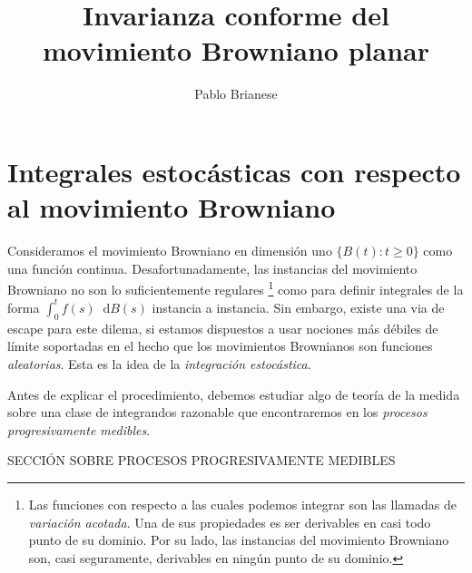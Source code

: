 \documentclass{article}
\title{Invarianza conforme del movimiento Browniano planar}
\author{Pablo Brianese}
\newcommand{\brownian}{B}
\newcommand{\dd}{\mathop{}\!\mathrm{d}}
\theoremstyle{plain}
\theoremstyle{remark}
\theoremstyle{definition}
\begin{document}
\maketitle


\part{Integrales estocásticas con respecto al movimiento Browniano}

Consideramos el movimiento Browniano en dimensión uno \(\{\brownian(t) : t \geq 0\}\) como una función continua.
Desafortunadamente, las instancias del movimiento Browniano no son lo suficientemente regulares
\footnote{Las funciones con respecto a las cuales podemos integrar son las llamadas de \emph{variación acotada}.
Una de sus propiedades es ser derivables en casi todo punto de su dominio.
Por su lado, las instancias del movimiento Browniano son, casi seguramente, derivables en ningún punto de su dominio.}
como para definir integrales de la forma \(\int_0^t f(s) \dd \brownian(s)\) instancia a instancia.
Sin embargo, existe una via de escape para este dilema, si estamos dispuestos a usar nociones más débiles de límite soportadas en el hecho que los movimientos Brownianos son funciones \emph{aleatorias}.
Esta es la idea de la \emph{integración estocástica}.

Antes de explicar el procedimiento, debemos estudiar algo de teoría de la medida sobre una clase de integrandos razonable que encontraremos en los \emph{procesos progresivamente medibles}.

SECCIÓN SOBRE PROCESOS PROGRESIVAMENTE MEDIBLES

\end{document}
